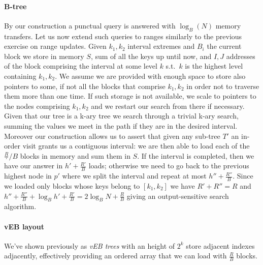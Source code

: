 \paragraph{B-tree}
By our construction a punctual query is answered with $\log_B(N)$ memory transfers.
Let us now extend such queries to ranges similarly to the previous exercise on range updates.
Given $k_1, k_2$ interval extremes and $B_i$ the current block we store in memory $S$, sum of all the keys up until now, and $I, J$ addresses of the block comprising the interval at some level $k$ s.t.\ $k$ is the highest level containing $k_1, k_2$.
We assume we are provided with enough space to store also pointers to some, if not all the blocks that comprise $k_1, k_2$ in order not to traverse them more than one time.
If such storage is not available, we scale to pointers to the nodes comprising $k_1, k_2$ and we restart our search from there if necessary.
Given that our tree is a k-ary tree we search through a trivial k-ary search, summing the values we meet in the path if they are in the desired interval.
Moreover our construction allows us to assert that given any sub-tree $T'$ an in-order visit grants us a contiguous interval: we are then able to load each of the $\frac{R}'/{B}$ blocks in memory and sum them in $S$.
If the interval is completed, then we have our answer in $h' + \frac{R'}{B}$ loads; otherwise we need to go back to the previous highest node in $p'$ where we split the interval and repeat at most $h'' + \frac{R''}{B}$.
Since we loaded only blocks whose keys belong to $[k_1, k_2]$ we have $R' + R'' = R$ and $h'' + \frac{R''}{B} + \log_B{h'} + \frac{R'}{B} = 2\log_B{N} + \frac{R}{B}$ giving an output-sensitive search algorithm.

\paragraph{vEB layout} We've shown previously as \emph{vEB trees} with an height of $2^k$ store adjacent indexes adjacently, effectively providing an ordered array that we can load with $\frac{R}{B}$ blocks.